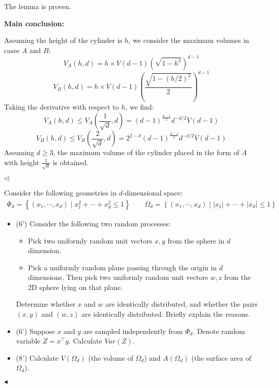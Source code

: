 \documentclass[11pt]{article}
\newenvironment{problem}[2][Problem]{\begin{trivlist}
\item[\hskip \labelsep {\bfseries #1}\hskip \labelsep {\bfseries #2.}]}{\hfill$\blacktriangleleft$\end{trivlist}}
\newenvironment{answer}[1][Answer]{\begin{trivlist}
\item[\hskip \labelsep {\bfseries #1.}\hskip \labelsep]}{\hfill$\lhd$\end{trivlist}}
\begin{document}
\begin{answer}
The lemma is proven.

\textbf{Main conclusion:}

Assuming the height of the cylinder is $h$, we consider the maximum volumes in cases $A$ and $B$:
\[
V_A(h,d) = h \times V(d-1) \left(\sqrt{1 - h^2}\right)^{d-1}
\]
\[
V_B(h,d) = h \times V(d-1) \left(\frac{\sqrt{1 - (h/2)^2}}{2}\right)^{d-1}
\]
Taking the derivative with respect to $h$, we find:
\[
V_A(h,d) \leq V_A\left(\frac{1}{\sqrt{d}}, d\right) = (d-1)^{\frac{d-1}{2}} d^{-d/2} V(d-1)
\]
\[
V_B(h,d) \leq V_B\left(\frac{2}{\sqrt{d}}, d\right) = 2^{2-d} (d-1)^{\frac{d-1}{2}} d^{-d/2} V(d-1)
\]
Assuming $d \geq 3$, the maximum volume of the cylinder placed in the form of $A$ with height $\frac{1}{\sqrt{d}}$ is obtained.

\end{answer}



\begin{problem}{8 (20')} 
Consider the following geometries in $d$-dimensional space:
\begin{align*}
    \Phi_d=\left\{(x_1,\cdots,x_d)\mid x_1^2+\cdots+x_d^2\leq 1\right\}\qquad
    \Omega_d=\left\{(x_1,\cdots,x_d)\mid |x_1|+\cdots+|x_d|\leq 1\right\}
\end{align*}
\begin{itemize}
    \item [(1)] (6') Consider the following two random processes:
    \begin{itemize}
        \item Pick two uniformly random unit vectors $x,y$ from the sphere in $d$ dimension.
        \item Pick a uniformly random plane passing through the origin in $d$ dimensions. Then pick two uniformly random unit vectors $w,z$ from the 2D sphere lying on that plane.
    \end{itemize}
    Determine whether $x$ and $w$ are identically distributed, and whether the pairs $(x,y)$ and $(w,z)$ are identically distributed. Briefly explain the reasons.
    \item [(2)] (6') Suppose $x$ and $y$ are sampled independently from $\Phi_d$. Denote random variable $Z=x^\top y$. Calculate $Var(Z)$.
    \item [(3)] (8') Calculate $V(\Omega_d)$ (the volume of $\Omega_d$) and $A(\Omega_d)$ (the surface area of $\Omega_d$).
\end{itemize}
\end{problem}
\end{document}

